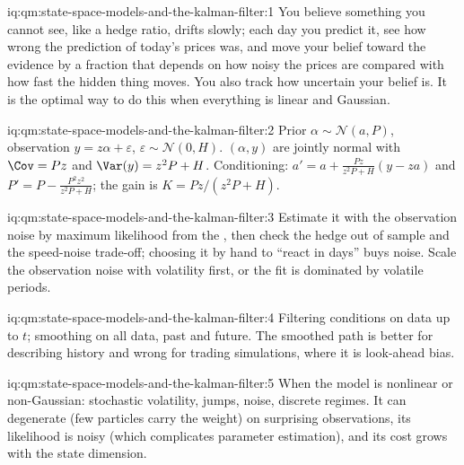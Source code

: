 \begin{solution}{iq:qm:state-space-models-and-the-kalman-filter:1}
You believe something you cannot see, like a hedge ratio, drifts slowly; each day you predict it, see how wrong the prediction of today's prices was, and move your
belief toward the evidence by a fraction that depends on how noisy the prices are compared with how fast the hidden thing moves. You also track how uncertain your
belief is. It is the optimal way to do this when everything is linear and Gaussian.
\end{solution}

\begin{solution}{iq:qm:state-space-models-and-the-kalman-filter:2}
Prior $\alpha \sim \mathcal N(a, P)$, observation $y = z\alpha + \varepsilon$, $\varepsilon \sim \mathcal N(0, H)$. $(\alpha, y)$ are jointly normal with $\Cov = Pz$ and $\Var(y) = z^2P + H$.
Conditioning: $a' = a + \frac{Pz}{z^2P + H}(y - za)$ and $P' = P - \frac{P^2z^2}{z^2P + H}$; the gain is $K = Pz/(z^2P + H)$.
\end{solution}

\begin{solution}{iq:qm:state-space-models-and-the-kalman-filter:3}
Estimate it with the observation noise by maximum likelihood from the , then check the hedge out of sample and the speed-noise trade-off;
choosing it by hand to ``react in days'' buys noise. Scale the observation noise with volatility first, or the fit is dominated by volatile periods.
\end{solution}

\begin{solution}{iq:qm:state-space-models-and-the-kalman-filter:4}
Filtering conditions on data up to $t$; smoothing on all data, past and future. The smoothed path is better for describing history and wrong for trading
simulations, where it is look-ahead bias.
\end{solution}

\begin{solution}{iq:qm:state-space-models-and-the-kalman-filter:5}
When the model is nonlinear or non-Gaussian: stochastic volatility, jumps,  noise, discrete regimes. It can degenerate (few particles carry the
weight) on surprising observations, its likelihood is noisy (which complicates parameter estimation), and its cost grows with the state dimension.
\end{solution}

